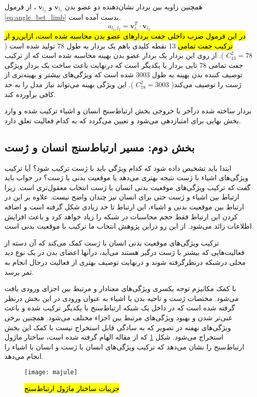همچنین زاویه بین بردار نشان‌دهنده دو عضو بدن %
   $\mathbf{v}_{l_1}$
   و 
    $\mathbf{v}_{l_2}$
 ، از فرمول %
\ref{eq:angle_bet_limb}
  بدست آمده است.
  \begin{equation}
  	\label{eq:angle_bet_limb}
  	a_{l_1, l_2}=\mathbf{v}_{l_1}^T \cdot \mathbf{v}_{l_2}
  \end{equation}
 \hl{ در این فرمول ضرب داخلی جفت بردارهای عضو بدن محاسبه شده است، ازاین‌رو از ترکیب جفت تمامی}
  13 نقطه کلیدی باهم یک بردار به طول 78 تولید شده است (%
  $C_{13}^2=78$
  ). از روی این بردار یک بردار عضو بدن بهینه محاسبه شده است که از ترکیب جفت تمامی 78 تایی بردار با یکدیگر است که درنهایت باعث ساخت یک بردار ویژگی توصیف کننده بدن بهینه به طول 3003 شده است که ویژگی‌های بیشتر و بهینه‌تری از ژست را توصیف می‌کند(
    $C_{78}^2=3003$
  ). این ویژگی بهینه می‌تواند نیاز مدل را به حد کافی برآورده کند. %
  \cite{Recognition_fusing_mutple_cue}
  
  بردار ساخته شده درآخر با خروجی بخش ارتباط‌سنج انسان و اشیاء ترکیب شده و وارد بخش نهایی برای امتیاز‌دهی می‌شود و تعیین می‌گردد که به کدام فعالیت تعلق دارد.
  
   \subsection{بخش دوم: مسیر ارتباط‌سنج انسان و ژست}
   
 ابتدا باید تشخیص داده شود که کدام ویژگی باید با ژست ترکیب شود؟ آیا ترکیب ویژگی‌های اشیاء با ژست نتیجه بهتری می‌دهد یا موقعیت بدنی با ژست؟ در جواب باید گفت که ترکیب ویژگی‌های موقعیت بدنی انسان با ژست انتخاب معقول‌تری است. زیرا ارتباط بین اشیاء و ژست حتی برای انسان نیز چندان واضح نیست. علاوه‌ بر این در ارتباط بین موقعیت بدنی و اشیاء، این ارتباط تا حد زیادی شکل گرفته است و اضافه کردن این ارتباط فقط حجم محاسبات در شبکه را زیاد خواهد کرد و باعث افزایش اطلاعات زائد می‌شود. از این رو دراین پژوهش انتخاب ما ترکیب با موقعیت بدنی است.
 
  ترکیب ویژگی‌های موقعیت بدنی انسان با ژست کمک می‌کند که آن دسته از فعالیت‌هایی که بیشتر با ژست درگیر هستند می‌آید، درآنها اعضای بدن در یک نوع دید محلی درشبکه درنظرگرفته شوند و درنهایت توصیف بهتری از فعالیت درحال انجام به ثمر برسد.
 
 با کمک مکانیزم توجه یکسری ویژگی‌های معنادار و مرتبط بین اجزای ورودی یافت می‌شود. مختصات ژست و ناحیه بدن یا اشیاء به عنوان ورودی‌ در این بخش درنظر گرفته شده است که در داخل یک شبکه ارتباط‌سنج با یکدیگر ترکیب شده و باعث غنی‌تر شدن و بهبود ویژگی‌های مرتبط بین اجزاء مختلف می‌شود. همچنین برخی ویژگی‌های نهفته در تصویر که به سادگی قابل استخراج نیست با کمک این بخش استخراج می‌شود. شکل %
 \ref{fig:majule}
 که از مقاله %
 \cite{Human_object_relation_action}
 الهام گرفته شده است،
 ساختار ماژول ارتباط‌سنج را نشان می‌دهد که ترکیب ویژگی‌های انسان با ژست و انسان با اشیاء را انجام می‌دهد. 
  \begin{figure}[ht]
 	\centerline{\texttt{[image: majule]}}
 	\caption{
 	\hl{جزییات ساختار ماژول ارتباط‌سنج}
 	}
 	\label{fig:majule}
 \end{figure}
 
